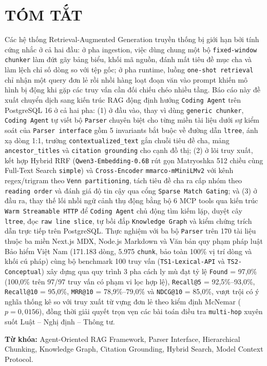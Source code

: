 \section{TÓM TẮT}

Các hệ thống Retrieval-Augmented Generation truyền thống bị giới hạn bởi tính cứng nhắc ở cả hai đầu: ở pha ingestion, việc dùng chung một bộ \texttt{fixed-window chunker} làm đứt gãy bảng biểu, khối mã nguồn, đánh mất tiêu đề mục cha và làm lệch chỉ số dòng so với tệp gốc; ở pha runtime, luồng \texttt{one-shot retrieval} chỉ nhận một query đơn lẻ rồi nhồi hàng loạt đoạn văn vào prompt khiến mô hình bị động khi gặp các truy vấn cần đối chiếu chéo nhiều tầng. Báo cáo này đề xuất chuyển dịch sang kiến trúc RAG động định hướng \texttt{Coding Agent} trên PostgreSQL 16 ở cả hai pha: (1) ở đầu vào, thay vì dùng \texttt{generic chunker}, \texttt{Coding Agent} tự viết bộ \texttt{Parser} chuyên biệt cho từng miền tài liệu dưới sự kiểm soát của \texttt{Parser interface} gồm 5 invariants bắt buộc về đường dẫn \texttt{ltree}, ánh xạ dòng 1:1, trường \texttt{contextualized\_text} gắn chuỗi tiêu đề cha, mảng \texttt{ancestor\_titles} và \texttt{citation grounding} cho cạnh đồ thị; (2) ở lõi truy xuất, kết hợp Hybrid RRF (\texttt{Qwen3-Embedding-0.6B} rút gọn Matryoshka 512 chiều cùng Full-Text Search \texttt{simple}) và \texttt{Cross-Encoder} \texttt{mmarco-mMiniLMv2} với kênh regex/trigram theo \texttt{Venn partitioning}, tách tiêu đề cha ra cấp nhóm theo \texttt{reading order} và đánh giá độ tin cậy qua cổng \texttt{Sparse Match Gating}; và (3) ở đầu ra, thay thế lối nhồi ngữ cảnh thụ động bằng bộ 6 MCP tools qua kiến trúc \texttt{Warm Streamable HTTP} để \texttt{Coding Agent} chủ động tìm kiếm lặp, duyệt cây \texttt{ltree}, đọc \texttt{raw line slice}, tự bồi đắp \texttt{Knowledge Graph} và kiểm chứng trích dẫn trực tiếp trên PostgreSQL. Thực nghiệm với ba bộ \texttt{Parser} trên 170 tài liệu thuộc ba miền Next.js MDX, Node.js Markdown và Văn bản quy phạm pháp luật Bảo hiểm Việt Nam (171.183 dòng, 5.975 \texttt{chunk}, bảo toàn 100\% vị trí dòng và khối cú pháp) cùng bộ benchmark 100 truy vấn (\texttt{TS1-Lexical-API} và \texttt{TS2-Conceptual}) xây dựng qua quy trình 3 pha cách ly mù đạt tỷ lệ \texttt{Found} = 97,0\% (100,0\% trên 97/97 truy vấn có phạm vi lọc hợp lệ), \texttt{Recall@5} = 92,5\%--93,0\%, \texttt{Recall@10} = 95,0\%, \texttt{MRR@10} = 78,9\%--79,0\% và \texttt{NDCG@10} = 85,0\%, vượt trội có ý nghĩa thống kê so với truy xuất từ vựng đơn lẻ theo kiểm định McNemar ($p = 0,0156$), đồng thời giải quyết trọn vẹn các bài toán điều tra \texttt{multi-hop} xuyên suốt Luật -- Nghị định -- Thông tư.

\vspace{0.2cm}
\noindent\textbf{Từ khóa:} Agent-Oriented RAG Framework, Parser Interface, Hierarchical Chunking, Knowledge Graph, Citation Grounding, Hybrid Search, Model Context Protocol.
